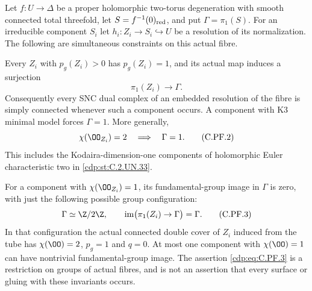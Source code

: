 
\begin{proposition}\label{cdp:st:C.2.UN.47}
Let $f:U\to\Delta$ be a proper holomorphic two-torus degeneration
with smooth connected total threefold, let $S=f^{-1}(0)_{\rm red}$,
and put $\Gamma=\pi_1(S)$. For an irreducible component $S_i$ let
$h_i:Z_i\to S_i\hookrightarrow U$ be a resolution of its normalization.
The following are simultaneous constraints on this actual fibre.

Every $Z_i$ with $p_g(Z_i)>0$ has $p_g(Z_i)=1$, and its actual
map induces a surjection
\[
                         \pi_1(Z_i)\longrightarrow\Gamma .
                                                        \tag{C.PF.1}\label{cdp:eq:C.PF.1}
\]
Consequently every SNC dual complex of an embedded resolution of
the fibre is simply connected whenever such a component occurs.
A component with K3 minimal model forces $\Gamma=1$.
More generally,
\[
                    \chi(\OO_{Z_i})=2
                         \quad\Longrightarrow\quad\Gamma=1 .
                                                        \tag{C.PF.2}\label{cdp:eq:C.PF.2}
\]
This includes the Kodaira-dimension-one components of holomorphic
Euler characteristic two in \ref{cdp:st:C.2.UN.33}.

For a component with $\chi(\OO_{Z_i})=1$, its fundamental-group
image in $\Gamma$ is zero, with just the following possible
group configuration:
\[
 \Gamma\simeq\Z/2\Z,\qquad
 \operatorname{im}\bigl(\pi_1(Z_i)\to\Gamma\bigr)=\Gamma .
                                                        \tag{C.PF.3}\label{cdp:eq:C.PF.3}
\]
In that configuration the actual connected double cover of $Z_i$
induced from the tube has
$\chi(\OO)=2$, $p_g=1$ and $q=0$. At most one component with
$\chi(\OO)=1$ can have nontrivial fundamental-group image.
The assertion \eqref{cdp:eq:C.PF.3} is a restriction on groups of actual fibres,
and is not an assertion that every surface or gluing with these
invariants occurs.
\end{proposition}

